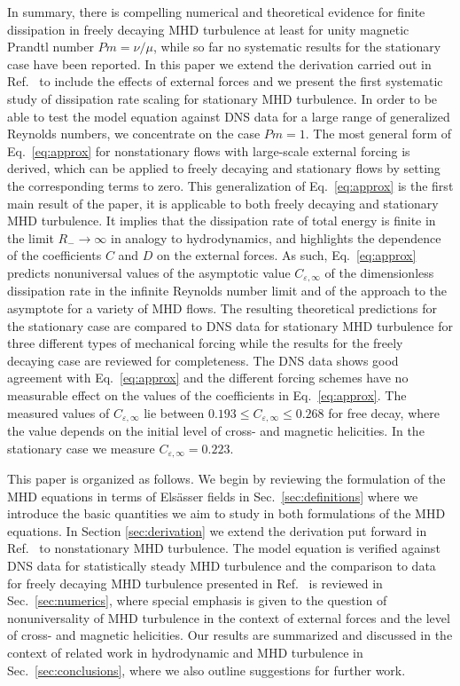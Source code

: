 \documentclass[aps,pre,onecolumn,superscriptaddress,notitlepage]{revtex4-1}
\newcommand{\Cinf}{C_{\varepsilon,\infty}}
\newcommand{\blue}[1]{{#1}}
\begin{document}
In summary, there is compelling numerical and theoretical evidence for finite
dissipation in freely decaying MHD turbulence \blue{at least for unity magnetic
Prandtl number $Pm = \nu/\mu$}, while so far no systematic results for the stationary case
have been reported.  In this paper we extend the derivation carried out in
Ref.~\cite{Linkmann15a} to include the effects of external forces and we
present the first systematic study of dissipation rate scaling for stationary
MHD turbulence. \blue{ In order to be able to test the model equation against
DNS data  for a large range of generalized Reynolds numbers, we concentrate on
the case $Pm = 1$.} The most general form of
Eq.~\eqref{eq:approx} for nonstationary flows with large-scale external forcing
is derived, which can be applied to freely decaying and stationary flows by
setting the corresponding terms to zero. This generalization of
Eq.~\eqref{eq:approx}  is the first main result of the paper, it is applicable
to both freely decaying and stationary MHD turbulence. It implies that the
dissipation rate of total energy is finite in the limit $R_- \to \infty$ in
analogy to hydrodynamics, and highlights the dependence of the coefficients $C$
and $D$ on the external forces. As such, Eq.~\eqref{eq:approx} predicts
nonuniversal values of the asymptotic value $\Cinf$ of the dimensionless
dissipation rate in the infinite Reynolds number limit and of the approach to
the asymptote for a variety of MHD flows.  The resulting theoretical
predictions for the stationary case are compared to DNS data for stationary MHD
turbulence for three different types of mechanical forcing while the results
for the freely decaying case \cite{Linkmann15a} are reviewed for completeness.
The DNS data shows good agreement with Eq.~\eqref{eq:approx} and the different
forcing schemes have no measurable effect on the values of the coefficients in
Eq.~\eqref{eq:approx}. The measured values of $\Cinf$ lie between $0.193
\leqslant \Cinf \leqslant 0.268$ for free decay, where the value depends on the
initial level of cross- and magnetic helicities. In the stationary case we
measure $\Cinf = 0.223$.  
 
This paper is organized as follows. We begin by reviewing the formulation of
the MHD equations in terms of Els\"asser fields in Sec.~\ref{sec:definitions}
where we introduce the basic quantities we aim to study in both formulations of
the MHD equations.  In Section \ref{sec:derivation} we extend the derivation
put forward in Ref.~\cite{Linkmann15a} to nonstationary MHD turbulence.  The
model equation is verified against DNS data for statistically steady MHD
turbulence and the comparison to data for freely decaying MHD turbulence
presented in Ref.~\cite{Linkmann15a} is reviewed in Sec.~\ref{sec:numerics},
where special emphasis is given to the question of nonuniversality of MHD
turbulence in the context of external forces and the level of cross- and
magnetic helicities.  Our results are summarized and discussed in the context
of related work in hydrodynamic and MHD turbulence in
Sec.~\ref{sec:conclusions}, where we also outline suggestions for further work.
\\
\end{document}
